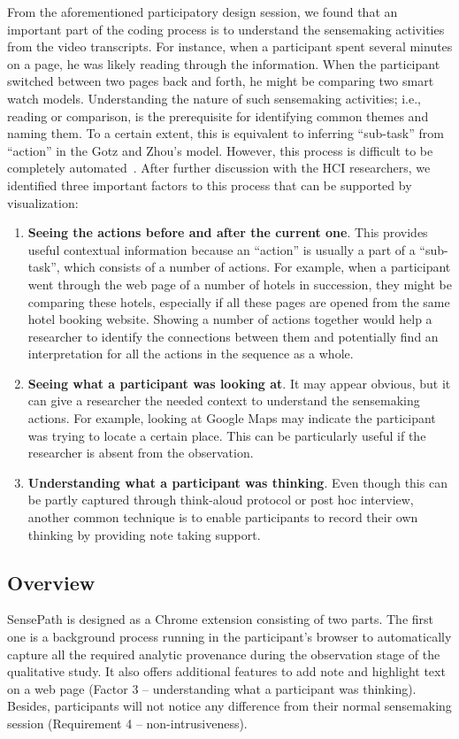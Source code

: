 From the aforementioned participatory design session, we found that an important part of the coding process is to understand the sensemaking activities from the video transcripts. For instance, when a participant spent several minutes on a page, he was likely reading through the information. When the participant switched between two pages back and forth, he might be comparing two smart watch models. Understanding the nature of such sensemaking activities; i.e., reading or comparison, is the prerequisite for identifying common themes and naming them. To a certain extent, this is equivalent to inferring ``sub-task'' from ``action'' in the Gotz and Zhou's model. However, this process is difficult to be completely automated~\cite{Dou2009}. After further discussion with the HCI researchers, we identified three important factors to this process that can be supported by visualization:
\begin{enumerate}
	\item \textbf{Seeing the actions before and after the current one}. This provides useful contextual information because an ``action'' is usually a part of a ``sub-task'', which consists of a number of actions. For example, when a participant went through the web page of a number of hotels in succession, they might be comparing these hotels, especially if all these pages are opened from the same hotel booking website. Showing a number of actions together would help a researcher to identify the connections between them and potentially find an interpretation for all the actions in the sequence as a whole.
	\item \textbf{Seeing what a participant was looking at}. It may appear obvious, but it can give a researcher the needed context to understand the sensemaking actions. For example, looking at Google Maps may indicate the participant was trying to locate a certain place. This can be particularly useful if the researcher is absent from the observation.
	\item \textbf{Understanding what a participant was thinking}. Even though this can be partly captured through think-aloud protocol or post hoc interview, another common technique is to enable participants to record their own thinking by providing note taking support.
\end{enumerate}

\subsection{Overview}
SensePath is designed as a Chrome extension consisting of two parts. The first one is a background process running in the participant's browser to automatically capture all the required analytic provenance during the observation stage of the qualitative study. It also offers additional features to add note and highlight text on a web page (Factor 3 -- understanding what a participant was thinking). Besides, participants will not notice any difference from their normal sensemaking session (Requirement 4 -- non-intrusiveness).

